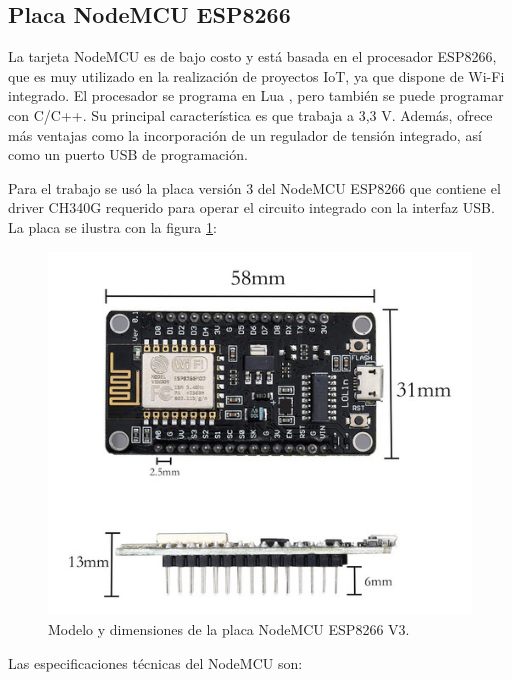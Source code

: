 \subsection{Placa NodeMCU ESP8266}

La tarjeta NodeMCU es de bajo costo y está basada en el procesador ESP8266, que es muy utilizado en la realización de proyectos IoT, ya que dispone de Wi-Fi integrado. El procesador se programa en Lua \citep{WEBSITE:38}, pero también se puede programar con C/C++. Su principal característica es que trabaja a 3,3 V.  Además, ofrece más ventajas como la incorporación de un regulador de tensión integrado, así como un puerto USB de programación. 

 
Para el trabajo se usó la placa versión 3 del NodeMCU ESP8266 que contiene el driver CH340G requerido para operar el circuito integrado con la interfaz USB. La placa se ilustra con la figura \ref{fig:nodemcu}:

\begin{figure}[htbp]
	\centering
	\includegraphics[width=.8\textwidth]{./Figures/nodemcuV3.jpg}
	\caption{Modelo y dimensiones de la placa NodeMCU ESP8266 V3.}

	\label{fig:nodemcu}
\end{figure}

\vspace{1.5 cm}
Las especificaciones técnicas del NodeMCU son:


